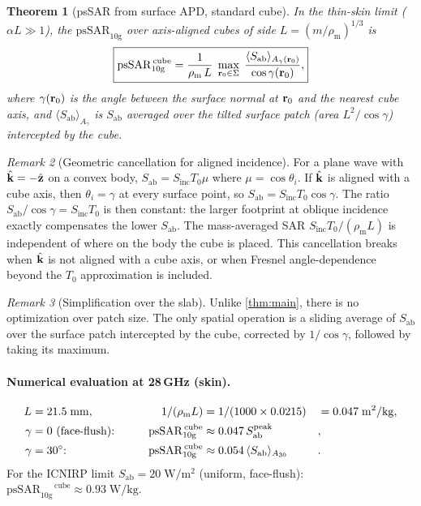 \documentclass[11pt,a4paper]{article}
\newtheorem{theorem}{Theorem}
\theoremstyle{definition}
\theoremstyle{remark}
\newtheorem{remark}[theorem]{Remark}
\newcommand{\Sab}{S_{\mathrm{ab}}}
\newcommand{\Sinc}{S_{\mathrm{inc}}}
\newcommand{\Tzero}{T_0}
\newcommand{\khat}{\hat{\vb{k}}}
\newcommand{\psSAR}{\ensuremath{\mathrm{psSAR}_{10\mathrm{g}}}}
\newcommand{\rhom}{\rho_{\mathrm{m}}}
\begin{document}
\begin{theorem}[psSAR from surface APD, standard cube]\label{thm:cube}
In the thin-skin limit ($\alpha L \gg 1$), the \psSAR{} over axis-aligned
cubes of side $L = (m/\rhom)^{1/3}$ is
\begin{equation}\label{eq:cube-main}
  \boxed{%
    \psSAR^{\,\mathrm{cube}}
    = \frac{1}{\rhom\,L}\;
      \max_{\vb{r}_0 \in \Sigma}\;
      \frac{\langle \Sab \rangle_{A_\gamma(\vb{r}_0)}}{\cos\gamma(\vb{r}_0)},
  }
\end{equation}
where $\gamma(\vb{r}_0)$ is the angle between the surface normal at
$\vb{r}_0$ and the nearest cube axis, and
$\langle\Sab\rangle_{A_\gamma}$ is $\Sab$ averaged over the tilted surface
patch (area $L^2/\cos\gamma$) intercepted by the cube.
\end{theorem}

\begin{remark}[Geometric cancellation for aligned incidence]
For a plane wave with $\khat = -\hat{\vb{z}}$ on a convex body,
$\Sab = \Sinc\Tzero\mu$ where $\mu = \cos\theta_i$.  If $\khat$ is aligned
with a cube axis, then $\theta_i = \gamma$ at every surface point, so
$\Sab = \Sinc\Tzero\cos\gamma$.  The ratio
$\Sab / \cos\gamma = \Sinc\Tzero$ is then constant: the larger footprint at
oblique incidence exactly compensates the lower $\Sab$.  The mass-averaged SAR
$\Sinc\Tzero/(\rhom L)$ is independent of where on the body the cube is
placed.  This cancellation breaks when $\khat$ is not aligned with a cube axis,
or when Fresnel angle-dependence beyond the $\Tzero$ approximation is included.
\end{remark}

\begin{remark}[Simplification over the slab]
Unlike \cref{thm:main}, there is no optimization over patch size.
The only spatial operation is a sliding average of $\Sab$ over the
surface patch intercepted by the cube, corrected by $1/\cos\gamma$, followed
by taking its maximum.
\end{remark}

\paragraph{Numerical evaluation at 28\,GHz (skin).}
\begin{alignat}{3}
  L &= 21.5\;\mathrm{mm}, &\qquad
  1/(\rhom L) &= 1/(1000 \times 0.0215) &&= 0.047\;\mathrm{m^2/kg}, \notag\\
  \gamma &= 0 \text{ (face-flush):} &\qquad
  \psSAR^{\,\mathrm{cube}} &\approx 0.047\,\Sab^{\mathrm{peak}} &&, \notag\\
  \gamma &= 30^\circ\text{:} &\qquad
  \psSAR^{\,\mathrm{cube}} &\approx 0.054\,\langle\Sab\rangle_{A_{30}} &&.
  \label{eq:cube-numerics}
\end{alignat}
For the ICNIRP limit $\Sab = 20\;\mathrm{W/m^2}$ (uniform, face-flush):
$\psSAR^{\,\mathrm{cube}} \approx 0.93\;\mathrm{W/kg}$.
\end{document}
